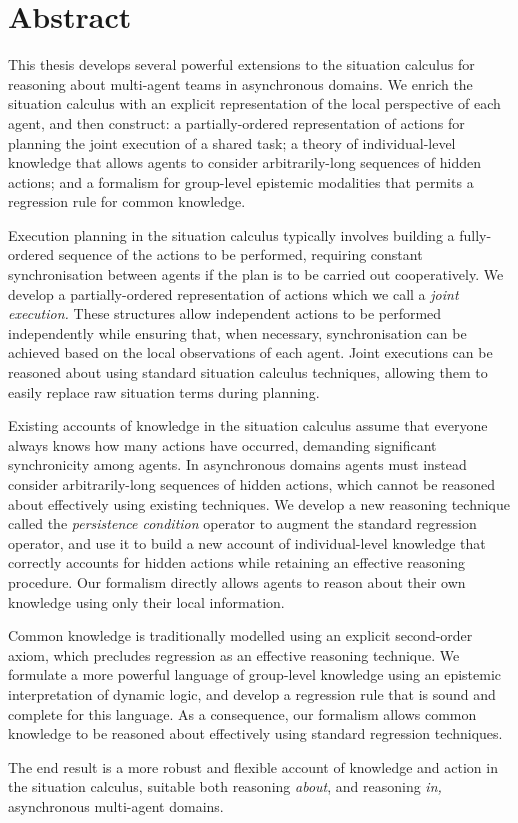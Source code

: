 

\chapter*{Abstract}

This thesis develops several powerful extensions to the situation
calculus for reasoning about multi-agent teams in asynchronous domains.
We enrich the situation calculus with an explicit representation of
the local perspective of each agent, and then construct: a partially-ordered
representation of actions for planning the joint execution of a shared
task; a theory of individual-level knowledge that allows agents to
consider arbitrarily-long sequences of hidden actions; and a formalism
for group-level epistemic modalities that permits a regression rule
for common knowledge.

Execution planning in the situation calculus typically involves building
a fully-ordered sequence of the actions to be performed, requiring
constant synchronisation between agents if the plan is to be carried
out cooperatively. We develop a partially-ordered representation of
actions which we call a \emph{joint execution.} These structures allow
independent actions to be performed independently while ensuring that,
when necessary, synchronisation can be achieved based on the local
observations of each agent. Joint executions can be reasoned about
using standard situation calculus techniques, allowing them to easily
replace raw situation terms during planning.

Existing accounts of knowledge in the situation calculus assume that
everyone always knows how many actions have occurred, demanding significant
synchronicity among agents. In asynchronous domains agents must instead
consider arbitrarily-long sequences of hidden actions, which cannot
be reasoned about effectively using existing techniques. We develop
a new reasoning technique called the \emph{persistence condition}
operator to augment the standard regression operator, and use it to
build a new account of individual-level knowledge that correctly accounts
for hidden actions while retaining an effective reasoning procedure.
Our formalism directly allows agents to reason about their own knowledge
using only their local information.

Common knowledge is traditionally modelled using an explicit second-order
axiom, which precludes regression as an effective reasoning technique.
We formulate a more powerful language of group-level knowledge using
an epistemic interpretation of dynamic logic, and develop a regression
rule that is sound and complete for this language. As a consequence,
our formalism allows common knowledge to be reasoned about effectively
using standard regression techniques.

The end result is a more robust and flexible account of knowledge
and action in the situation calculus, suitable both reasoning \emph{about},
and reasoning \emph{in,} asynchronous multi-agent domains.

